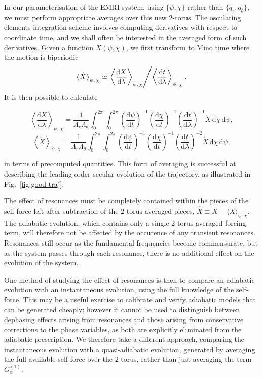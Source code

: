 \documentclass[aps,prd,amsfonts,amssymb,amsmath,nofootinbib,reprint,showpacs,superscriptaddress,twocolumn]{revtex4}
\newcommand{\figref}[1]{Fig.\ \ref{fig:#1}}
\newcommand{\dd}{\ensuremath{\mathrm{d}}}
\newcommand{\diff}[2]{\ensuremath{\dfrac{\dd {#1}}{\dd {#2}}}}
\newcommand{\intd}[4]{\ensuremath{\int_{#1}^{#2}{#3}\,\dd{#4}}}
\begin{document}
In our parameterisation of the EMRI system, using $\{\psi,\chi\}$ rather than $\{q_r,q_\theta\}$, we must perform appropriate averages over this new $2$-torus. The osculating elements integration scheme involves computing derivatives with respect to coordinate time, and we shall often be interested in the averaged form of such derivatives. Given a function $X(\psi,\chi)$, we first transform to Mino time where the motion is biperiodic
\begin{equation}
\left\langle \dot{X}\right\rangle_{\psi,\,\chi} \simeq \left.\left\langle \diff{X}{\lambda}\right\rangle_{\psi,\,\chi}\middle/\left\langle \diff{t}{\lambda}\right\rangle_{\psi,\,\chi}\right..
\end{equation}
It is then possible to calculate
\begin{widetext}\begin{equation}
\label{eq:2torus-average}
\left\langle \diff{X}{\lambda}\right\rangle_{\psi,\,\chi} = \frac1{\Lambda_r\Lambda_\theta} \intd{0}{2\pi}{ \intd{0}{2\pi}{ \left(\diff{\psi}{t}\right)^{-1} \left(\diff{\chi}{t}\right)^{-1} \left(\diff{t}{\lambda}\right)^{-1} \dot{X} }{\chi} }{\psi},
\end{equation}
\begin{equation}
\left\langle \dot{X}\right\rangle_{\psi,\,\chi} = \frac1{\Lambda_r\Lambda_\theta} \intd{0}{2\pi}{ \intd{0}{2\pi}{ \left(\diff{\psi}{t}\right)^{-1} \left(\diff{\chi}{t}\right)^{-1} \left(\diff{t}{\lambda}\right)^{-2} \dot{X} }{\chi} }{\psi},
\end{equation}\end{widetext}
in terms of precomputed quantities. This form of averaging is successful at describing the leading order secular evolution of the trajectory, as illustrated in \figref{good-traj}.

The effect of resonances must be completely contained within the pieces of the self-force left after subtraction of the $2$-torus-averaged pieces, $\hat{X}\equiv X-\langle X\rangle_{\psi,\,\chi}$. The adiabatic evolution, which contains only a single $2$-torus-averaged forcing term, will therefore not be affected by the occurence of any transient resonances. Resonances still occur as the fundamental frequencies become commensurate, but as the system passes through each resonance, there is no additional effect on the evolution of the system.

One method of studying the effect of resonances is then to compare an adiabatic evolution with an instantaneous evolution, using the full knowledge of the self-force. This may be a useful exercise to calibrate and verify adiabatic models that can be generated cheaply; however it cannot be used to distinguish between dephasing effects arising from resonances and those arising from conservative corrections to the phase variables, as both are explicitly eliminated from the adiabatic prescription. We therefore take a different approach, comparing the instantaneous evolution with a quasi-adiabatic evolution, generated by averaging the full available self-force over the $2$-torus, rather than just averaging the term $G_\alpha^{(1)}$.
\end{document}
